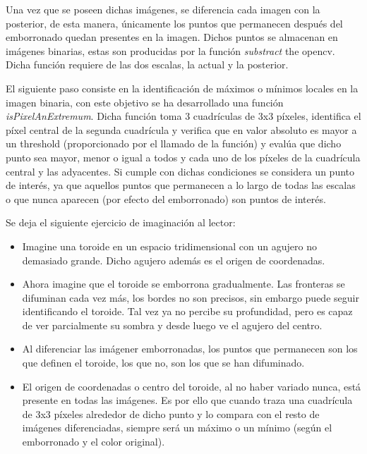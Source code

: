 \documentclass[a4paper,12pt]{article}
\begin{document}
{\vspace{0.5cm}

Una vez que se poseen dichas imágenes, se diferencia cada imagen con la posterior, de esta manera, únicamente los puntos que permanecen después del emborronado quedan presentes en la imagen.
Dichos puntos se almacenan en imágenes binarias, estas son producidas por la función \textit{substract} the opencv. Dicha función requiere de las dos escalas, la actual y la posterior.

\vspace{0.5cm}

El siguiente paso consiste en la identificación de máximos o mínimos locales en la imagen binaria, con este objetivo se ha desarrollado una función \textit{isPixelAnExtremum}. Dicha función
toma 3 cuadrículas de 3x3 píxeles, identifica el píxel central de la segunda cuadrícula y verifica que en valor absoluto es mayor a un threshold (proporcionado por el llamado de la función)
y evalúa que dicho punto sea mayor, menor o igual a todos y cada uno de los píxeles de la cuadrícula central y las adyacentes. Si cumple con dichas condiciones se considera un punto de interés,
ya que aquellos puntos que permanecen a lo largo de todas las escalas o que nunca aparecen (por efecto del emborronado) son puntos de interés.

\vspace{0.5cm}

Se deja el siguiente ejercicio de imaginación al lector:

\vspace{0.5cm}

\begin{itemize}
    \item Imagine una toroide en un espacio tridimensional con un agujero no demasiado grande. Dicho agujero además es el origen de coordenadas.
    \item Ahora imagine que el toroide se emborrona gradualmente. Las fronteras se difuminan cada vez más, los bordes no son precisos, sin embargo puede seguir identificando el toroide. Tal vez ya no percibe su profundidad, pero es capaz de ver parcialmente su sombra y desde luego ve el agujero del centro.
    \item Al diferenciar las imágener emborronadas, los puntos que permanecen son los que definen el toroide, los que no, son los que se han difuminado.
    \item El origen de coordenadas o centro del toroide, al no haber variado nunca, está presente en todas las imágenes. Es por ello que cuando traza una cuadrícula de 3x3 píxeles alrededor de dicho punto y lo compara con el resto de imágenes diferenciadas, siempre será un máximo o un mínimo (según el emborronado y el color original).
\end{itemize}

}
\end{document}
